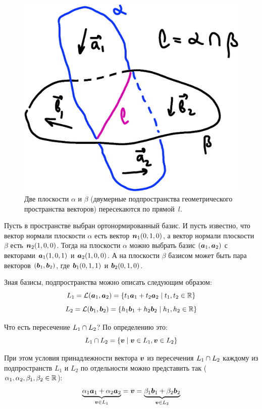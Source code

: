\documentclass[a4paper,12pt]{article}
\begin{document}
  \begin{figure}[h]
    \centering
  
    \includegraphics[width=0.5\columnwidth]{combined-example}
  
    \caption{Две плоскости $\alpha$ и $\beta$ (двумерные подпространства геометрического пространства векторов) пересекаются по прямой~$l$.}
    \label{fig:combined-example}
  \end{figure}
  
  Пусть в пространстве выбран ортонормированный базис.
  И пусть известно, что вектор нормали плоскости $\alpha$ есть вектор $\boldsymbol n_1(0, 1, 0)$, а вектор нормали плоскости $\beta$ есть $\boldsymbol n_2(1, 0, 0)$.
  Тогда на плоскости $\alpha$ можно выбрать базис $(\boldsymbol a_1, \boldsymbol a_2)$ с векторами $\boldsymbol a_1(1, 0, 1)$ и $\boldsymbol a_2(1, 0, 0)$.
  А на плоскости $\beta$ базисом может быть пара векторов $(\boldsymbol b_1, \boldsymbol b_2)$, где $\boldsymbol b_1(0, 1, 1)$ и $\boldsymbol b_2(0, 1, 0)$.
  
  Зная базисы, подпространства можно описать следующим образом:
  \[
    L_1 = \mathcal L(\boldsymbol a_1, \boldsymbol a_2) = \{t_1 \boldsymbol a_1 + t_2 \boldsymbol a_2 \mid t_1, t_2 \in \operatorname{\mathbb R}\}
  \]
  \[
    L_2 = \mathcal L(\boldsymbol b_1, \boldsymbol b_2) = \{h_1 \boldsymbol b_1 + h_2 \boldsymbol b_2 \mid h_1, h_2 \in \operatorname{\mathbb R}\}
  \]
  
  Что есть пересечение $L_1 \hm\cap L_2$?
  По определению это:
  \[
    L_1 \cap L_2 = \{\boldsymbol v \mid \boldsymbol v \in L_1, \boldsymbol v \in L_2\}
  \]
  
  При этом условия принадлежности вектора $\boldsymbol v$ из пересечения $L_1 \hm\cap L_2$ каждому из подпространств $L_1$ и $L_2$ по отдельности можно представить так ($\alpha_1, \alpha_2, \beta_1, \beta_2 \hm\in \RR$):
  \begin{equation}\label{eq:l1-cap-l2}
    \underbrace{\alpha_1 \boldsymbol a_1 + \alpha_2 \boldsymbol a_2}_{\boldsymbol v \in L_1} = \boldsymbol v = \underbrace{\beta_1 \boldsymbol b_1 + \beta_2 \boldsymbol b_2}_{\boldsymbol v \in L_2}
  \end{equation}
  
\end{document}
